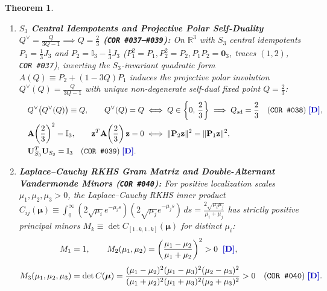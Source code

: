 \documentclass[11pt,a4paper]{article}
\newcommand{\catD}{\text{\textbf{\textcolor{blue!75!black}{[D]}}}}
\theoremstyle{definition}
\theoremstyle{plain}
\newtheorem{theorem}[axiom]{Theorem}
\theoremstyle{remark}
\begin{document}
\begin{theorem}
\begin{enumerate}[label=(\roman*)]
\begin{align}
  \end{align}
  \item \textbf{$S_3$ Central Idempotents and Projective Polar Self-Duality $Q^\vee = \frac{Q}{3Q - 1} \implies Q = \frac{2}{3}$ (\texttt{COR~\#037--\#039}):}
  On $\mathbb{R}^3$ with $S_3$ central idempotents $P_1 = \frac{1}{3}J_3$ and $P_2 = \mathbb{I}_3 - \frac{1}{3}J_3$ ($P_1^2 = P_1, P_2^2 = P_2, P_1 P_2 = \mathbf{0}_3$, traces $(1, 2)$, \texttt{COR~\#037}), inverting the $S_3$-invariant quadratic form $A(Q) \equiv P_2 + (1 - 3Q)P_1$ induces the projective polar involution $Q^\vee(Q) = \frac{Q}{3Q - 1}$ with unique non-degenerate self-dual fixed point $Q = \frac{2}{3}$:
  \begin{equation}\label{eq:c1_polar_conic}
    \begin{aligned}
    &\quad Q^\vee\bigl(Q^\vee(Q)\bigr) \equiv Q, \qquad Q^\vee(Q) = Q \iff Q \in \left\{0,\, \frac{2}{3}\right\} \implies Q_{\mathrm{sd}} = \frac{2}{3} \quad (\text{\texttt{COR~\#038}}) \;\catD, \\
    &\quad \mathbf{A}\!\left(\frac{2}{3}\right)^2 = \mathbb{I}_3, \qquad \mathbf{z}^T\mathbf{A}\!\left(\frac{2}{3}\right)\mathbf{z} = 0 \iff \|\mathbf{P}_2\mathbf{z}\|^2 = \|\mathbf{P}_1\mathbf{z}\|^2, \\
    &\quad \mathbf{U}_{S_3}^T\mathbf{U}_{S_3} = \mathbb{I}_3 \quad (\text{\texttt{COR~\#039}}) \;\catD.
    \end{aligned}
  \end{equation}
  \item \textbf{Laplace--Cauchy RKHS Gram Matrix and Double-Alternant Vandermonde Minors (\texttt{COR~\#040}):}
  For positive localization scales $\mu_1, \mu_2, \mu_3 > 0$, the Laplace--Cauchy RKHS inner product $C_{ij}(\bm{\mu}) \equiv \int_0^\infty (2\sqrt{\mu_i}e^{-\mu_i s})(2\sqrt{\mu_j}e^{-\mu_j s})\,ds = \frac{2\sqrt{\mu_i\mu_j}}{\mu_i + \mu_j}$ has strictly positive principal minors $M_k \equiv \det C_{[1..k, 1..k]}(\bm{\mu})$ for distinct $\mu_i$:
  \begin{align}
  M_1 &= 1, \qquad
  M_2(\mu_1, \mu_2) = \left(\frac{\mu_1 - \mu_2}{\mu_1 + \mu_2}\right)^2 > 0 \;\;\catD, \nonumber \\[4pt]
  M_3(\mu_1, \mu_2, \mu_3) &= \det C(\bm{\mu}) = \frac{(\mu_1 - \mu_2)^2(\mu_1 - \mu_3)^2(\mu_2 - \mu_3)^2}{(\mu_1 + \mu_2)^2(\mu_1 + \mu_3)^2(\mu_2 + \mu_3)^2} > 0
  \quad \textnormal{(\texttt{COR~\#040})} \;\catD. \label{eq:c1_cauchy_rkhs_minors}
  \end{align}
\end{enumerate}
\end{theorem}
\end{document}
